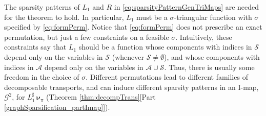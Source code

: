 \documentclass[twoside,11pt]{article}
\newcommand{\genm}{\boldsymbol{\nu} }   %
\newcommand{\Ac}{\mathcal{A}}
\newcommand{\Sc}{\mathcal{S}}
\newcommand{\Gcb}{\boldsymbol{\mathcal{G}}}
\newcommand{\lmap}{L} %
\newcommand{\rmap}{R} %
\newcommand{\Aset}{ \Ac }
\newcommand{\Sset}{ \Sc }
\newcommand{\pull}{^\sharp}
\begin{document}
%
%
%
%

The sparsity patterns of $\lmap_1$ and $\rmap$ in \eqref{eq:sparsityPatternGenTriMaps}
are needed for the theorem to hold.
In particular, $\lmap_1$ must be a $\sigma$-triangular function with $\sigma$ specified by 
\eqref{eq:formPerm}.
%
Notice that \eqref{eq:formPerm} does not prescribe an exact
permutation, but just a few constraints on a feasible $\sigma$.  
Intuitively,
these constraints say that $\lmap_1$ should be a function whose components
with indices in $\Sset$ depend only on the variables in $\Sset$ 
(whenever $\Sset \neq \emptyset$), and whose
components with indices in $\Aset$ depend only on the variables in
$\Aset \cup \Sset$.  
%
%
Thus,
there is usually some freedom in the choice of $\sigma$.  
Different permutations lead to different families of decomposable transports, and
can induce different sparsity patterns in an 
I-map, $\Gcb^2$, for $\lmap_1\pull\,\genm_\pi$ 
(Theorem \ref{thm:decompTrans}[Part \ref{graphSparsification_partImap}]).
%
\end{document}
